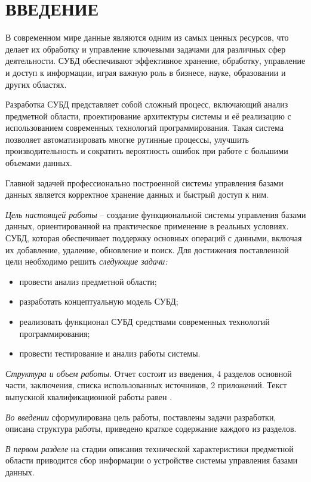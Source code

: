\section*{ВВЕДЕНИЕ}

В современном мире данные являются одним из самых ценных ресурсов, что делает их обработку и управление ключевыми задачами для различных сфер деятельности. СУБД обеспечивают эффективное хранение, обработку, управление и доступ к информации, играя важную роль в бизнесе, науке, образовании и других областях.

Разработка СУБД представляет собой сложный процесс, включающий анализ предметной области, проектирование архитектуры системы и её реализацию с использованием современных технологий программирования. Такая система позволяет автоматизировать многие рутинные процессы, улучшить производительность и сократить вероятность ошибок при работе с большими объемами данных.

Главной задачей профессионально построенной системы управления базами данных является корректное хранение данных и быстрый доступ к ним.

\emph{Цель настоящей работы} – создание функциональной системы управления базами данных, ориентированной на практическое применение в реальных условиях. СУБД, которая обеспечивает поддержку основных операций с данными, включая их добавление, удаление, обновление и поиск. Для достижения поставленной цели необходимо решить \emph{следующие задачи:}
\begin{itemize}
\item провести анализ предметной области;
\item разработать концептуальную модель СУБД;
\item реализовать функционал СУБД средствами современных технологий программирования;
\item провести тестирование и анализ работы системы.
\end{itemize}

\emph{Структура и объем работы.} Отчет состоит из введения, 4 разделов основной части, заключения, списка использованных источников, 2 приложений. Текст выпускной квалификационной работы равен .

\emph{Во введении} сформулирована цель работы, поставлены задачи разработки, описана структура работы, приведено краткое содержание каждого из разделов.

\emph{В первом разделе} на стадии описания технической характеристики предметной области приводится сбор информации о устройстве системы управления базами данных.


